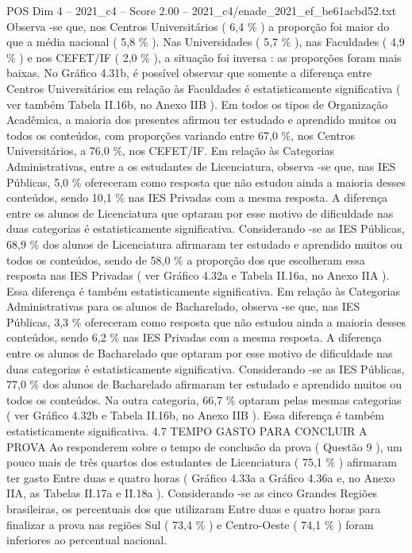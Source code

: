 \begin{textsample}{POS Dim 4 – 2021\_c4 – Score 2.00 – 2021\_c4/enade\_2021\_ef\_be61acbd52.txt}
Observa -se que, nos Centros Universitários ( 6,4 \% ) a proporção foi maior do que a média nacional ( 5,8 \% ).
Nas Universidades ( 5,7 \% ), nas Faculdades ( 4,9 \% ) e nos CEFET/IF ( 2,0 \% ), a situação foi inversa : as proporções foram mais baixas.
No Gráfico 4.31b, é possível observar que somente a diferença entre Centros Universitários em relação às Faculdades é estatisticamente significativa ( ver também Tabela II.16b, no Anexo IIB ).
Em todos os tipos de Organização Acadêmica, a maioria dos presentes afirmou ter estudado e aprendido muitos ou todos os conteúdos, com proporções variando entre 67,0 \%, nos Centros Universitários, a 76,0 \%, nos CEFET/IF.
Em relação às Categorias Administrativas, entre a os estudantes de Licenciatura, observa -se que, nas IES Públicas, 5,0 \% ofereceram como resposta que não estudou ainda a maioria desses conteúdos, sendo 10,1 \% nas IES Privadas com a mesma resposta.
A diferença entre os alunos de Licenciatura que optaram por esse motivo de dificuldade nas duas categorias é estatisticamente significativa.
Considerando -se as IES Públicas, 68,9 \% dos alunos de Licenciatura afirmaram ter estudado e aprendido muitos ou todos os conteúdos, sendo de 58,0 \% a proporção dos que escolheram essa resposta nas IES Privadas ( ver Gráfico 4.32a e Tabela II.16a, no Anexo IIA ).
Essa diferença é também estatisticamente significativa.
Em relação às Categorias Administrativas para os alunos de Bacharelado, observa -se que, nas IES Públicas, 3,3 \% ofereceram como resposta que não estudou ainda a maioria desses conteúdos, sendo 6,2 \% nas IES Privadas com a mesma resposta.
A diferença entre os alunos de Bacharelado que optaram por esse motivo de dificuldade nas duas categorias é estatisticamente significativa.
Considerando -se as IES Públicas, 77,0 \% dos alunos de Bacharelado afirmaram ter estudado e aprendido muitos ou todos os conteúdos.
Na outra categoria, 66,7 \% optaram pelas mesmas categorias ( ver Gráfico 4.32b e Tabela II.16b, no Anexo IIB ).
Essa diferença é também estatisticamente significativa. 4.7 TEMPO GASTO PARA CONCLUIR A PROVA Ao responderem sobre o tempo de conclusão da prova ( Questão 9 ), um pouco mais de três quartos dos estudantes de Licenciatura ( 75,1 \% ) afirmaram ter gasto Entre duas e quatro horas ( Gráfico 4.33a a Gráfico 4.36a e, no Anexo IIA, as Tabelas II.17a e II.18a ).
Considerando -se as cinco Grandes Regiões brasileiras, os percentuais dos que utilizaram Entre duas e quatro horas para finalizar a prova nas regiões Sul ( 73,4 \% ) e Centro-Oeste ( 74,1 \% ) foram inferiores ao percentual nacional.

\end{textsample}
